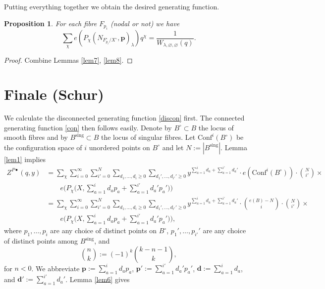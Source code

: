 \documentclass[12pt]{amsart}
\newtheorem{proposition}[theorem]{Proposition}
\theoremstyle{definition}
\theoremstyle{property}
\newcommand\mdot{{\scriptscriptstyle\bullet}}
\newcommand\p{\mathbf{p}}
\newcommand\bfd{\mathbf{d}}
\newcommand\sing{\mathrm{sing}}
\renewcommand\_{^{}_}
\begin{document}
Putting everything together we obtain the desired generating function.

\begin{proposition} \label{punctgenfun}
For each fibre $F_{p_i}$ (nodal or not) we have
$$
\sum_{\chi} e(P_{\chi}(N_{F_{p_i}^{\circ} / X^\circ}, \p)_{\lambda}) q^\chi = \frac{1}{W_{\lambda,\varnothing,\varnothing}(q)}.
$$
\end{proposition}
\begin{proof}
Combine Lemmas \ref{lem7}, \ref{lem8}.
\end{proof}


\section{Finale (Schur)}

We calculate the disconnected generating function \eqref{discon} first. The connected generating function \eqref{con} then follows easily. Denote by $B^{\circ} \subset B$ the locus of smooth fibres and by $B^{\sing} \subset B$ the locus of singular fibres. Let $\mathrm{Conf}^{i}(B^\circ)$ be the configuration space of $i$ unordered points on $B^\circ$ and let $N := |B^{\sing}|$. Lemma \ref{lem1} implies
\begin{align*}
Z^{P \mdot}(q,y) &= \sum_\chi \sum_{i = 0}^{\infty} \sum_{i'=0}^{N} \sum_{d_1, \ldots, d_i \geq 0} \sum_{d_{1}', \ldots, d_{i'}' \geq 0} y^{\sum_{a=1}^{i} d_a + \sum_{a=1}^{i'} d_{a}'} \cdot e(\mathrm{Conf}^{i}(B^\circ)) \cdot \binom{N}{i'} \times \\
&\qquad e\big(P_\chi\big(X,\sum_{a=1}^{i} d_a p_a + \sum_{a=1}^{i'} d_{a}' p_{a}'\big)\big) \\
&=\sum_\chi \sum_{i = 0}^{\infty} \sum_{i'=0}^{N} \sum_{d_1, \ldots, d_i \geq 0} \sum_{d_{1}', \ldots, d_{i'}' \geq 0} y^{\sum_{a=1}^{i} d_a + \sum_{a=1}^{i'} d_{a}'} \cdot \binom{e(B) - N}{i} \cdot \binom{N}{i'} \times \\
&\qquad e\big(P_\chi\big(X,\sum_{a=1}^{i} d_a p_a + \sum_{a=1}^{i'} d_{a}' p_{a}'\big)\big),
\end{align*}
where $p_1, \ldots, p_i$ are any choice of distinct points on $B^\circ$, $p_{1}', \ldots, p_{i'}'$ are any choice of distinct points among $B^{\sing}$, and
\begin{equation} \label{binom}
\binom{n}{k} := (-1)^k \binom{k-n-1}{k},
\end{equation} 
for $n<0$. We abbreviate $\p := \sum_{a=1}^{i} d_a p_a$, $\p' := \sum_{a=1}^{i'} d_{a}' p_{a}'$, $\bfd := \sum_{a=1}^{i} d_a$, and $\bfd' := \sum_{a=1}^{i'} d_{a}'$. Lemma \ref{lem6} gives
\end{document}
